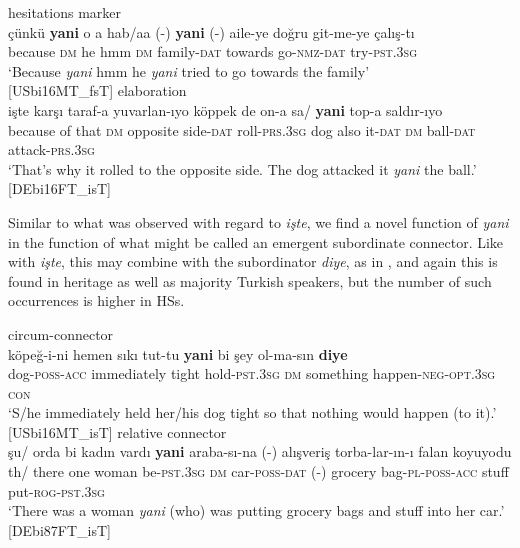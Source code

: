 \documentclass[output=paper,colorlinks,citecolor=brown]{langscibook}
\begin{document}
\ea hesitations marker\label{ex:labrenzetal:18}\\
\gll çünkü \textbf{yani} o {a hab/aa} (-) \textbf{yani} (-) aile-ye doğru git-me-ye çalış-tı\\ because \textsc{dm} he hmm {} \textsc{dm} {} family-\textsc{dat} towards	go-\textsc{nmz}-\textsc{dat} try-\textsc{pst.3sg}\\
\glt `Because \textit{yani} hmm he \textit{yani} tried to go towards the family' \\ \hfill[USbi16MT\_fsT]
\ex elaboration\label{ex:labrenzetal:19}\\
 işte karşı taraf-a yuvarlan-ıyo	köppek de {on-a sa/} \textbf{yani}	top-a saldır-ıyo\\ {because of that}	\textsc{dm} opposite side-\textsc{dat} roll-\textsc{prs.3sg} dog also it-\textsc{dat} \textsc{dm} ball-\textsc{dat} attack-\textsc{prs.3sg}\\
\glt ‘That's why it rolled to the opposite side. The dog attacked it \textit{yani} the ball.’ \hfill[DEbi16FT\_isT]
\z

\noindent Similar to what was observed with regard to \textit{işte}, we find a novel function of \textit{yani} in the function of what might be called an emergent subordinate connector. Like with \textit{işte}, this may combine with the subordinator \textit{diye}, as in , and again this is found in heritage as well as majority Turkish speakers, but the number of such occurrences is higher in HSs.

\ea circum-connector\label{ex:labrenzetal:20}\\
\gll köpeğ-i-ni	hemen sıkı tut-tu \textbf{yani} {bi şey} ol-ma-sın \textbf{diye}\\ dog-\textsc{poss-acc} immediately tight hold-\textsc{pst.3sg} \textsc{dm} something happen-\textsc{neg-opt.3sg} \textsc{con}\\
\glt ‘S/he immediately held her/his dog tight so that nothing would happen (to it).’ \hfill[USbi16MT\_isT]
\ex relative connector\label{ex:labrenzetal:21}\\
\gll şu/ orda bi kadın vardı \textbf{yani} araba-sı-na (-) alışveriş torba-lar-ın-ı falan koyuyodu\\ th/ there one woman be-\textsc{pst.3sg} \textsc{dm} car-\textsc{poss-dat} (-) grocery bag\textsc{-pl-poss-acc} stuff put\textsc{-rog-pst.3sg}\\
\glt ‘There was a woman \textit{yani} (who) was putting grocery bags and stuff into her car.’ \hfill[DEbi87FT\_isT]
\z
\end{document}

